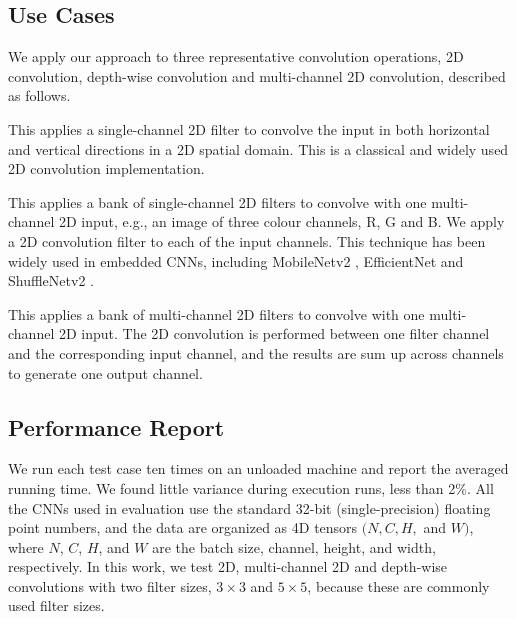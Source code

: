 \subsection{Use Cases}
We apply our approach to three representative convolution operations, 2D convolution, depth-wise convolution and
multi-channel 2D convolution, described as follows.

 This applies a single-channel 2D filter to convolve the input in both horizontal and vertical
directions in a 2D spatial domain. This is a classical and widely used 2D convolution implementation.

 This applies a bank of single-channel 2D filters to convolve with one multi-channel 2D input, e.g., an
image of three colour channels, R, G and B. We apply a 2D convolution filter to each of the input channels. This technique has been widely
used in embedded CNNs, including MobileNetv2 \cite{Sandler_2018_CVPR}, EfficientNet \cite{tan2019efficientnet} and ShuffleNetv2
\cite{Ma_2018_ECCV}.

 This applies a bank of multi-channel 2D filters to convolve with one multi-channel 2D input. The 2D
convolution is performed between one filter channel and the corresponding input channel, and the results are sum up across channels to
generate one output channel.


\subsection{Performance Report}
We run each test case ten times on an unloaded machine and report the averaged running time. We found little variance during execution
runs, less than 2\%.  All the CNNs used in evaluation use the standard 32-bit (single-precision) floating point numbers, and the data are
organized as 4D tensors $(N,C,H,$ and $W)$, where $N$, $C$, $H$, and $W$ are the batch size, channel, height, and width, respectively. In
this work, we test 2D, multi-channel 2D and depth-wise convolutions with two filter sizes, $3 \times 3$ and $5 \times 5$, because these
are commonly used filter sizes.
%


